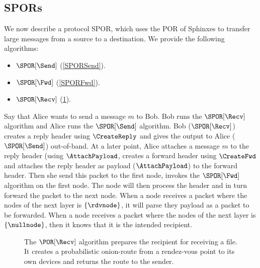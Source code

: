 
\subsection{\Acfp*{SPOR}}%
\label{sec:message_passing}


We now describe a protocol \ac{SPOR}, which uses the \ac{POR} of Sphinxes to 
transfer large messages from a source to a destination.
We provide the following algorithms:
\begin{itemize}
  \item \(\SPOR[\Send]\) (\cref{SPORSend}).
  \item \(\SPOR[\Fwd]\) (\cref{SPORFwd}).
  \item \(\SPOR[\Recv]\) (\cref{SPORRecv}).
\end{itemize}

Say that Alice wants to send a message \(m\) to Bob.
Bob runs the \(\SPOR[\Recv]\) algorithm and Alice runs the \(\SPOR[\Send]\) 
algorithm.
Bob (\ie \(\SPOR[\Recv]\)) creates a reply header using \(\CreateReply\) and 
gives the output to Alice (\ie \(\SPOR[\Send]\)) out-of-band.
At a later point, Alice attaches a message \(m\) to the reply header (using 
\(\AttachPayload\), creates a forward header using \(\CreateFwd\) and attaches 
the reply header as payload (\(\AttachPayload\)) to the forward header.
Then she send this packet to the first node, \ie invokes the \(\SPOR[\Fwd]\) 
algorithm on the first node.
The node will then process the header and in turn forward the packet to the 
next node.
When a node receives a packet where the nodes of the next layer is 
\(\{\rdvnode\}\), it will parse they payload as a packet to be forwarded.
When a node receives a packet where the nodes of the next layer is 
\(\{\nullnode\}\), then it knows that it is the intended recipient.


\begin{figure}
  \caption{\label{SPORRecv}%
    The \(\POR[\Recv]\) algorithm prepares the recipient for receiving a file.
    It creates a probabilistic onion-route from a rendez-vous point to its own 
    devices and returns the route to the sender.
  }
\end{figure}


